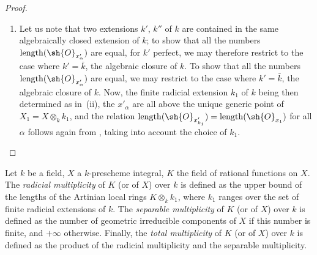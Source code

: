 \begin{proof}
\begin{enumerate}[label=(\roman*)]
Suppose then that $X$ is locally of finite type over $k$; then, $X''$ is locally Noetherian for every extension $k''$ of $k'$.
Taking for $k''$ an algebraically closed extension of $k'$, we are reduced by virtue of  to proving the assertion when $k'$ is \emph{algebraically closed}.
Since $k'$ is then a separable extension of the algebraic closure $\bar{k}$ of $k$, it follows from~(i) that we are reduced to the case where $k'=\bar{k}$, the algebraic closure.
Now, we know (by replacing $X$ by an affine open of finite type over $k$) that there is a finite radicial extension $k_1$ of $k$ such that $(X\otimes_k k_1)_{\mathrm{red}}$ is separable over $k_1$ ; hence $(X\otimes_k k_1)_{\mathrm{red}}\otimes_{k_1}\bar{k}$ is reduced .
By virtue of , we are therefore reduced again to the case where $k'$ is a finite radicial extension of $k$, and we conclude as before.
  \item Let us note that two extensions $k'$, $k''$ of $k$ are contained in the same algebraically closed extension of $k$; to show that all the numbers $\operatorname{length}(\sh{O}_{x'_\alpha})$ are equal, for $k'$ perfect, we may therefore restrict to the case where $k'=\bar{k}$, the algebraic closure of $k$.
To show that all the numbers $\operatorname{length}(\sh{O}_{x'_\alpha})$ are equal, we may restrict to the case where $k'=\bar{k}$, the algebraic closure of $k$.
Now, the finite radicial extension $k_1$ of $k$ being then determined as in~(ii), the $x'_\alpha$ are all above the unique generic point of $X_1 = X\otimes_k k_1$, and the relation $\operatorname{length}(\sh{O}_{x'_{k_1}}) = \operatorname{length}(\sh{O}_{x_1})$ for all $\alpha$ follows again from , taking into account the choice of $k_1$.
\end{enumerate}
\end{proof}

\begin{definition}[4.7.4]
\label{IV.4.7.4}
Let $k$ be a field, $X$ a $k$-prescheme integral, $K$ the field of rational functions on $X$.
The \emph{radicial multiplicity} of $K$ (or of $X$) over $k$ is defined as the upper bound of the lengths of the Artinian local rings $K\otimes_k k_1$, where $k_1$ ranges over the set of finite radicial extensions of $k$.
The \emph{separable multiplicity} of $K$ (or of $X$) over $k$ is defined as the number of geometric irreducible components of $X$ if this number is finite, and $+\infty$ otherwise.
Finally, the \emph{total multiplicity} of $K$ (or of $X$) over $k$ is defined as the product of the radicial multiplicity and the separable multiplicity.
\end{definition}


